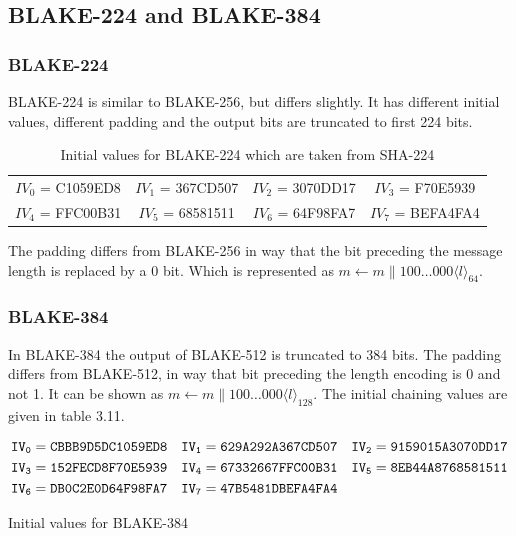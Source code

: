 \subsection{BLAKE-224 and BLAKE-384}

  \subsubsection{BLAKE-224}
  BLAKE-224 is similar to BLAKE-256, but differs slightly. It has different initial values, different padding and the
  output bits are truncated to first 224 bits.
  \begin{table}[h]
    \begin{center}
      \begin{tabular}{ *{4}{c}}
        $IV_{0}$ = C1059ED8 & $IV_{1}$ = 367CD507 & $IV_{2}$ = 3070DD17 & $IV_{3}$ = F70E5939 \\
        $IV_{4}$ = FFC00B31 & $IV_{5}$ = 68581511 & $IV_{6}$ = 64F98FA7 & $IV_{7}$ = BEFA4FA4 \\
      \end{tabular}
      \caption{Initial values for BLAKE-224 which are taken from SHA-224 \cite{00002}}
    \end{center}
  \end{table}
  The padding differs from BLAKE-256 in way that the bit preceding the message length is replaced by a 0 bit. Which
  is represented as $m \gets m \parallel 100 \dots 000 \langle l \rangle_{64}$.

  \subsubsection{BLAKE-384}
  In BLAKE-384 the output of BLAKE-512 is truncated to 384 bits. The padding differs from BLAKE-512, in way that bit
  preceding the length encoding is 0 and not 1. It can be shown as $m \gets m \parallel 100 \dots 000 \langle l \rangle_{128}$. The
  initial chaining values are given in table 3.11.
  \begin{table}[h]
    \begin{align*}
      {\tt IV_{0}} &= {\tt CBBB9D5DC1059ED8} & {\tt IV_{1}} &= {\tt 629A292A367CD507} & {\tt IV_{2}} &= {\tt 9159015A3070DD17} \\
      {\tt IV_{3}} &= {\tt 152FECD8F70E5939} & {\tt IV_{4}} &= {\tt 67332667FFC00B31} & {\tt IV_{5}} &= {\tt 8EB44A8768581511} \\
      {\tt IV_{6}} &= {\tt DB0C2E0D64F98FA7} & {\tt IV_{7}} &= {\tt 47B5481DBEFA4FA4} &                                        \\      
    \end{align*}
    \caption{Initial values for BLAKE-384 \cite{00002}}
  \end{table}


